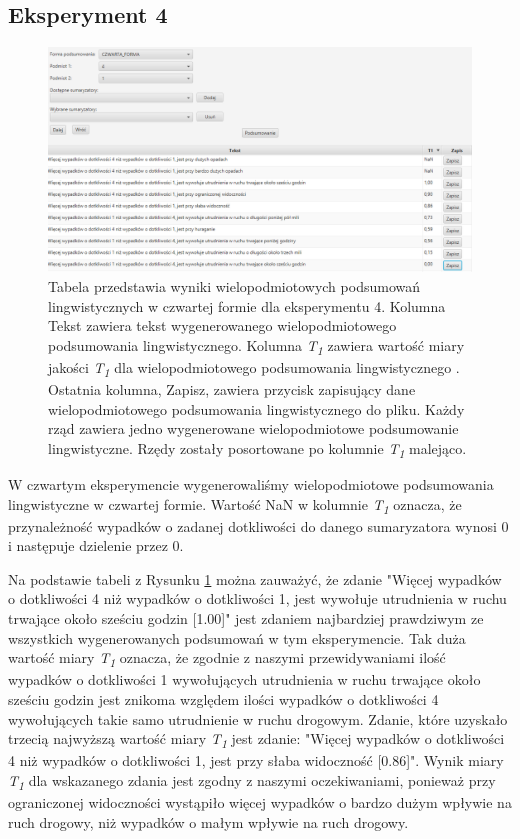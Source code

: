 \documentclass{classrep}
\begin{document}
\newpage
\subsection{Eksperyment 4}
\label{section:ex_wiel4}

\begin{figure}[h!]
\centering
\includegraphics[width=15cm]{ex_wiel4.png}
\vspace{-0.3cm}
\caption{Tabela przedstawia wyniki wielopodmiotowych podsumowań lingwistycznych w czwartej formie dla eksperymentu 4. Kolumna Tekst zawiera tekst wygenerowanego wielopodmiotowego podsumowania lingwistycznego. Kolumna \textit{T\textsubscript{1}} zawiera wartość miary jakości \textit{T\textsubscript{1}} dla wielopodmiotowego podsumowania lingwistycznego \cite{niewiadomski19}. Ostatnia kolumna, Zapisz, zawiera przycisk zapisujący dane wielopodmiotowego podsumowania lingwistycznego do pliku. Każdy rząd zawiera jedno wygenerowane wielopodmiotowe podsumowanie lingwistyczne. Rzędy zostały posortowane po kolumnie \textit{T\textsubscript{1}} malejąco. }
\label{wykr_ex_wiel4}
\end{figure}


W czwartym eksperymencie wygenerowaliśmy wielopodmiotowe podsumowania lingwistyczne w czwartej formie. Wartość NaN w kolumnie \textit{T\textsubscript{1}} oznacza, że przynależność wypadków o zadanej dotkliwości do danego sumaryzatora wynosi 0 i następuje dzielenie przez 0.

Na podstawie tabeli z Rysunku \ref{wykr_ex_wiel4} można zauważyć, że zdanie "Więcej wypadków o dotkliwości 4 niż wypadków o dotkliwości 1, jest wywołuje utrudnienia w ruchu trwające około sześciu godzin [1.00]" jest zdaniem najbardziej prawdziwym ze wszystkich wygenerowanych podsumowań w tym eksperymencie. Tak duża wartość miary \textit{T\textsubscript{1}} oznacza, że zgodnie z naszymi przewidywaniami ilość wypadków o dotkliwości 1 wywołujących utrudnienia w ruchu trwające około sześciu godzin jest znikoma względem ilości wypadków o dotkliwości 4 wywołujących takie samo utrudnienie w ruchu drogowym. Zdanie, które uzyskało trzecią najwyższą wartość miary \textit{T\textsubscript{1}} jest zdanie: "Więcej wypadków o dotkliwości 4 niż wypadków o dotkliwości 1, jest przy słaba widoczność [0.86]". Wynik miary \textit{T\textsubscript{1}} dla wskazanego zdania jest zgodny z naszymi oczekiwaniami, ponieważ przy ograniczonej widoczności wystąpiło więcej wypadków o bardzo dużym wpływie na ruch drogowy, niż wypadków o małym wpływie na ruch drogowy.
\end{document}
